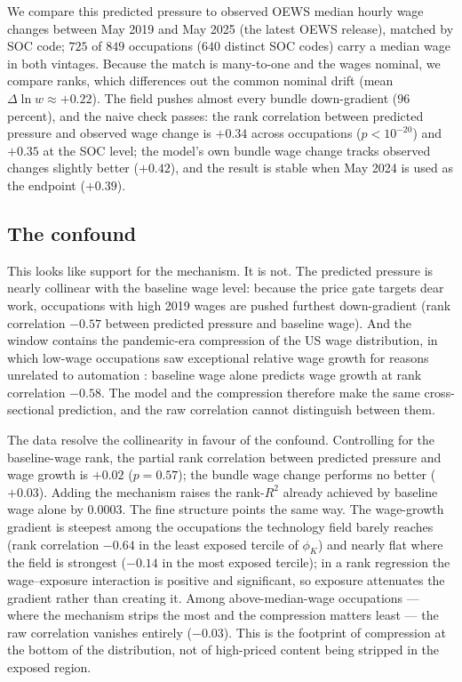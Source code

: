 \documentclass[12pt, a4paper]{article}
\begin{document}
We compare this predicted pressure to observed OEWS median hourly wage
changes between May 2019 and May 2025 (the latest OEWS release), matched
by SOC code; $725$ of $849$ occupations ($640$ distinct SOC codes) carry
a median wage in both vintages. Because the match is many-to-one and the
wages nominal, we compare ranks, which differences out the common
nominal drift (mean $\Delta\ln w\approx+0.22$). The field pushes almost
every bundle down-gradient ($96$ percent), and the naive check passes:
the rank correlation between predicted pressure and observed wage change
is $+0.34$ across occupations ($p<10^{-20}$) and $+0.35$ at the SOC
level; the model's own bundle wage change tracks observed changes
slightly better ($+0.42$), and the result is stable when May 2024 is
used as the endpoint ($+0.39$).

\subsection{The confound}
\label{sec:check-confound}

This looks like support for the mechanism. It is not. The predicted pressure is nearly collinear with the
baseline wage level: because the price gate targets dear work,
occupations with high 2019 wages are pushed furthest down-gradient (rank
correlation $-0.57$ between predicted pressure and baseline wage). And
the window contains the pandemic-era compression of the US wage
distribution, in which low-wage occupations saw exceptional relative
wage growth for reasons unrelated to automation
\parencite{autor2023compression}: baseline wage alone predicts wage
growth at rank correlation $-0.58$. The model and the compression
therefore make the same cross-sectional prediction, and the raw
correlation cannot distinguish between them.

The data resolve the collinearity in favour of the confound. Controlling
for the baseline-wage rank, the partial rank correlation between
predicted pressure and wage growth is $+0.02$ ($p=0.57$); the bundle
wage change performs no better ($+0.03$). Adding the mechanism raises
the rank-$R^2$ already achieved by baseline wage alone by $0.0003$. The
fine structure points the same way. The wage-growth gradient is steepest
among the occupations the technology field barely reaches (rank
correlation $-0.64$ in the least exposed tercile of $\phi_K$) and nearly
flat where the field is strongest ($-0.14$ in the most exposed tercile);
in a rank regression the wage--exposure interaction is positive and
significant, so exposure attenuates the gradient rather than creating
it. Among above-median-wage occupations --- where the mechanism strips
the most and the compression matters least --- the raw correlation
vanishes entirely ($-0.03$). This is the footprint of compression at the
bottom of the distribution, not of high-priced content being stripped in
the exposed region.
\end{document}

